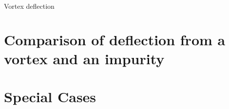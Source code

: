 \begin{chapter}{\label{cha:vortexdeflection}Vortex deflection}
\section{\label{section:deflectioncompare} Comparison of deflection from a vortex and an impurity}
\section{\label{section:specialcases} Special Cases}
\end{chapter}
